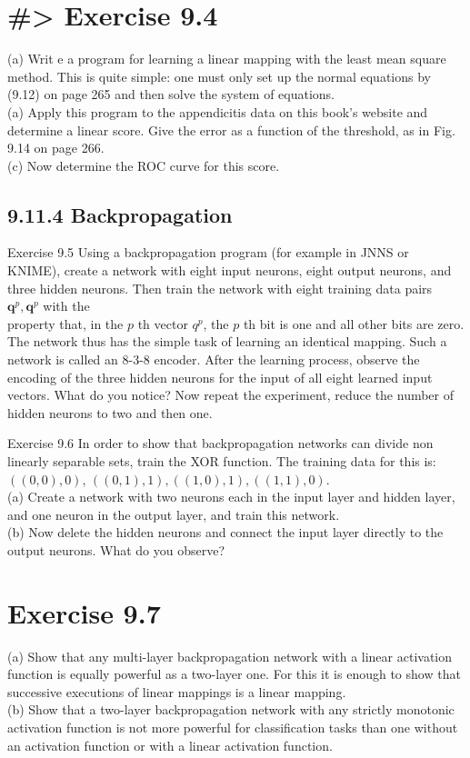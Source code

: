 \documentclass[10pt]{article}
\begin{document}
\section*{\#> Exercise 9.4}
(a) Writ
e a program for learning a linear mapping with the least mean square method. This is quite simple: one must only set up the normal equations by (9.12) on page 265 and then solve the system of equations.\\
(a) Apply this program to the appendicitis data on this book's website and determine a linear score. Give the error as a function of the threshold, as in Fig. 9.14 on page 266.\\
(c) Now determine the ROC curve for this score.

\subsection*{9.11.4 Backpropagation}
Exercise 9.5 Using a backpropagation program (for example in JNNS or KNIME), create a network with eight input neurons, eight output neurons, and three hidden neurons. Then train the network with eight training data pairs $\boldsymbol{q}^{p}, \boldsymbol{q}^{p}$ with the\\
property that, in the $p$ th vector $q^{p}$, the $p$ th bit is one and all other bits are zero. The network thus has the simple task of learning an identical mapping. Such a network is called an 8-3-8 encoder. After the learning process, observe the encoding of the three hidden neurons for the input of all eight learned input vectors. What do you notice? Now repeat the experiment, reduce the number of hidden neurons to two and then one.

Exercise 9.6 In order to show that backpropagation networks can divide non linearly separable sets, train the XOR function. The training data for this is: $((0,0), 0)$, $((0,1), 1),((1,0), 1),((1,1), 0)$.\\
(a) Create a network with two neurons each in the input layer and hidden layer, and one neuron in the output layer, and train this network.\\
(b) Now delete the hidden neurons and connect the input layer directly to the output neurons. What do you observe?

\section*{Exercise 9.7}
(a) Show that any multi-layer backpropagation network with a linear activation function is equally powerful as a two-layer one. For this it is enough to show that successive executions of linear mappings is a linear mapping.\\
(b) Show that a two-layer backpropagation network with any strictly monotonic activation function is not more powerful for classification tasks than one without an activation function or with a linear activation function.
\end{document}
